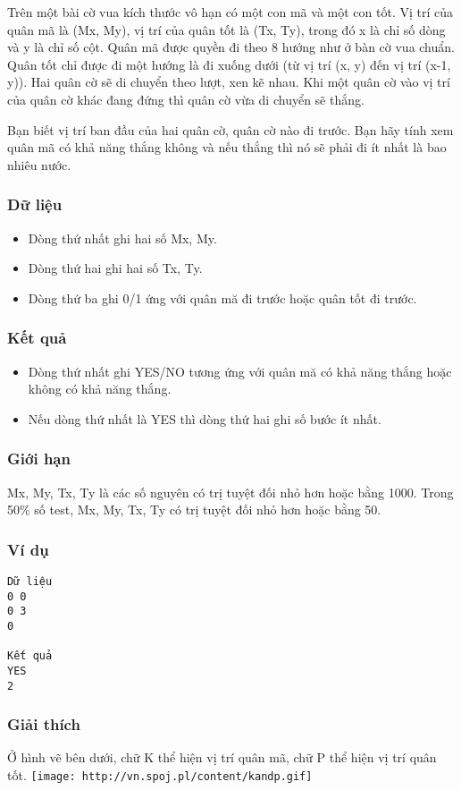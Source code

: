 



   Trên một bài cờ vua kích thước vô hạn có một con mã và một con tốt. Vị trí của quân mã là (Mx, My), vị trí của quân tốt là (Tx, Ty), trong đó x là chỉ số dòng và y là chỉ số cột. Quân mã được quyền đi theo 8 hướng như ở bàn cờ vua chuẩn. Quân tốt chỉ được đi một hướng là đi xuống dưới (từ vị trí (x, y) đến vị trí (x-1, y)). Hai quân cờ sẽ di chuyển theo lượt, xen kẽ nhau. Khi một quân cờ vào vị trí của quân cờ khác đang đứng thì quân cờ vừa di chuyển sẽ thắng.  

   Bạn biết vị trí ban đầu của hai quân cờ, quân cờ nào đi trước. Bạn hãy tính xem quân mã có khả năng thắng không và nếu thắng thì nó sẽ phải đi ít nhất là bao nhiêu nước.  

\subsubsection{   Dữ liệu  }
\begin{itemize}
	\item     Dòng thứ nhất ghi hai số Mx, My.   
	\item     Dòng thứ hai ghi hai số Tx, Ty.   
	\item     Dòng thứ ba ghi 0/1 ứng với quân mă đi trước hoặc quân tốt đi trước.   
\end{itemize}

\subsubsection{   Kết quả  }
\begin{itemize}
	\item     Dòng thứ nhất ghi YES/NO tương ứng với quân mă có khả năng thắng hoặc không có khả năng thắng.   
	\item     Nếu dòng thứ nhất là YES thì dòng thứ hai ghi số bước ít nhất.   
\end{itemize}

\subsubsection{   Giới hạn  }

   Mx, My, Tx, Ty là các số nguyên có trị tuyệt đối nhỏ hơn hoặc bằng 1000. Trong 50\% số test, Mx, My, Tx, Ty có trị tuyệt đối nhỏ hơn hoặc bằng 50.  

\subsubsection{   Ví dụ  }
\begin{verbatim}
Dữ liệu
0 0
0 3
0

Kết quả
YES
2
\end{verbatim}

\subsubsection{   Giải thích  }

   Ở hình vẽ bên dưới, chữ K thể hiện vị trí quân mã, chữ P thể hiện vị trí quân tốt.  
\texttt{[image: http://vn.spoj.pl/content/kandp.gif]}